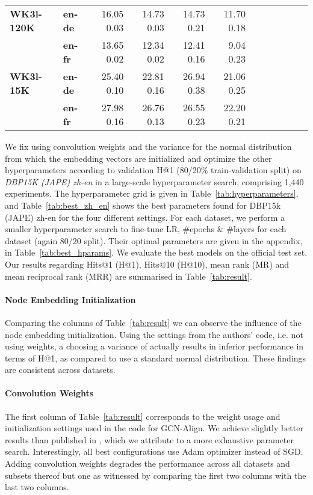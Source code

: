 \documentclass[runningheads]{llncs}
\begin{document}
\begin{table}
\begin{tabular*}{\linewidth}{*{2}{l}*{10}{@{\extracolsep{\fill}}r}@{\extracolsep{\fill}}}
        \midrule
\textbf{WK3l-120K} & \textbf{en-de} &  16.05  0.03 &  14.73  0.03 &  14.73  \phantom{0}0.21 &  11.70  \phantom{0}0.18 \\
        & \textbf{en-fr} &  13.65  0.02 &  12.34  0.02 &  12.41  \phantom{0}0.16 &   9.04  \phantom{0}0.23 \\
        \midrule
\textbf{WK3l-15K} & \textbf{en-de} &  25.40  0.10 &  22.81  0.16 &  26.94  \phantom{0}0.38 &  21.06  \phantom{0}0.25 \\
        & \textbf{en-fr} &  27.98  0.16 &  26.76  0.13 &  26.55  \phantom{0}0.23 &  22.20  \phantom{0}0.21 \\
\bottomrule
\end{tabular*}
\end{table}
We fix using convolution weights and the variance for the normal distribution from which the embedding vectors are initialized and optimize the other hyperparameters according to validation H@1 (80/20\% train-validation split) on \emph{DBP15K (JAPE) zh-en} in a large-scale hyperparameter search, comprising 1,440 experiments.
The hyperparameter grid is given in Table~\ref{tab:hyperparameters}, and Table~\ref{tab:best_zh_en} shows the best parameters found for DBP15k (JAPE) zh-en for the four different settings.
For each dataset, we perform a smaller hyperparameter search to fine-tune LR, \#epochs \& \#layers for each dataset (again 80/20 split).
Their optimal parameters are given in the appendix, in Table~\ref{tab:best_hparams}.
We evaluate the best models on the official test set.
Our results regarding Hits@1 (H@1), Hits@10 (H@10), mean rank (MR) and mean reciprocal rank (MRR) are summarised in Table~\ref{tab:result}.


\paragraph{Node Embedding Initialization}
Comparing the columns of Table~\ref{tab:result} we can observe the influence of the node embedding initialization.
Using the settings from the authors' code, i.e. not using weights, a choosing a variance of  actually results in inferior performance in terms of H@1, as compared to use a standard normal distribution.
These findings are consistent across datasets.

\paragraph{Convolution Weights}
The first column of Table~\ref{tab:result} corresponds to the weight usage and initialization settings used in the code for GCN-Align.
We achieve slightly better results than published in \cite{DBLP:conf/emnlp/WangLLZ18}, which we attribute to a more exhaustive parameter search.
Interestingly, all best configurations use Adam optimizer instead of SGD.
Adding convolution weights degrades the performance across all datasets and subsets thereof but one as witnessed by comparing the first two columns with the last two columns.
\end{document}
